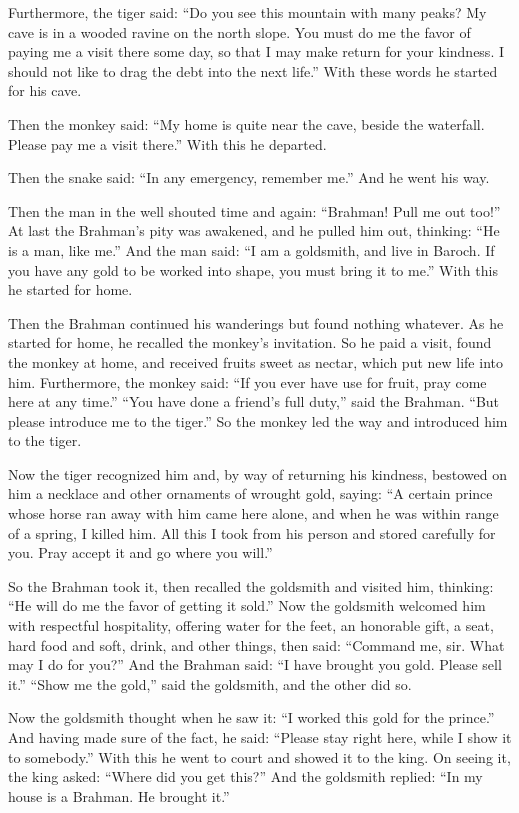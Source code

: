 \documentclass[article, twoside, 14pt]{memoir}
\begin{document}
Furthermore, the tiger said:
``Do you see this mountain with many peaks? My cave is in a wooded ravine on the north slope. You must do me the favor of paying me a visit there some day, so that I may make return for your kindness. I should not like to drag the debt into the next life.''
With these words he started for his cave.

Then the monkey said:
``My home is quite near the cave, beside the waterfall. Please pay me a visit there.''
With this he departed.

Then the snake said: ``In any emergency, remember me.'' And he went
his way.

Then the man in the well shouted time and again:
``Brahman! Pull me out too!'' At last the Brahman's pity was
awakened, and he pulled him out, thinking:
``He is a man, like me.'' And the man said:
``I am a goldsmith, and live in Baroch. If you have any gold to be worked into shape, you must bring it to me.''
With this he started for home.

Then the Brahman continued his wanderings but found nothing
whatever. As he started for home, he recalled the monkey's
invitation. So he paid a visit, found the monkey at home, and
received fruits sweet as nectar, which put new life into him.
Furthermore, the monkey said:
``If you ever have use for fruit, pray come here at any time.''
``You have done a friend's full duty,'' said the Brahman.
``But please introduce me to the tiger.'' So the monkey led the way
and introduced him to the tiger.

Now the tiger recognized him and, by way of returning his kindness,
bestowed on him a necklace and other ornaments of wrought gold,
saying:
``A certain prince whose horse ran away with him came here alone, and when he was within range of a spring, I killed him. All this I took from his person and stored carefully for you. Pray accept it and go where you will.''

So the Brahman took it, then recalled the goldsmith and visited
him, thinking: ``He will do me the favor of getting it sold.'' Now
the goldsmith welcomed him with respectful hospitality, offering
water for the feet, an honorable gift, a seat, hard food and soft,
drink, and other things, then said:
``Command me, sir. What may I do for you?'' And the Brahman said:
``I have brought you gold. Please sell it.'' ``Show me the gold,''
said the goldsmith, and the other did so.

Now the goldsmith thought when he saw it:
``I worked this gold for the prince.'' And having made sure of the
fact, he said:
``Please stay right here, while I show it to somebody.'' With this
he went to court and showed it to the king. On seeing it, the king
asked: ``Where did you get this?'' And the goldsmith replied:
``In my house is a Brahman. He brought it.''
\end{document}
